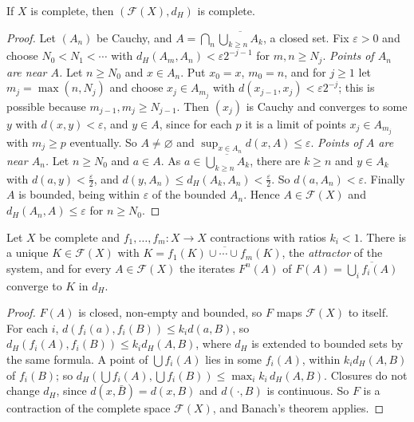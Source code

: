\begin{theorem}\label{thm:hausdorffcomplete}
If $X$ is complete, then $(\mathcal F(X),d_H)$ is complete.
\end{theorem}
\begin{proof}
Let $(A_n)$ be Cauchy, and $A=\bigcap_n\overline{\bigcup_{k\ge n}A_k}$, a closed set. Fix $\varepsilon>0$ and choose $N_0<N_1<\cdots$ with $d_H(A_m,A_n)<\varepsilon2^{-j-1}$ for
$m,n\ge N_j$. \emph{Points of $A_n$ are near $A$.} Let $n\ge N_0$ and $x\in A_n$. Put $x_0=x$, $m_0=n$, and for $j\ge1$ let $m_j=\max(n,N_j)$ and choose $x_j\in A_{m_j}$ with
$d(x_{j-1},x_j)<\varepsilon2^{-j}$; this is possible because $m_{j-1},m_j\ge N_{j-1}$. Then $(x_j)$ is Cauchy and converges to some $y$ with $d(x,y)<\varepsilon$, and $y\in A$,
since for each $p$ it is a limit of points $x_j\in A_{m_j}$ with $m_j\ge p$ eventually. So $A\ne\varnothing$ and $\sup_{x\in A_n}d(x,A)\le\varepsilon$.
\emph{Points of $A$ are near $A_n$.} Let $n\ge N_0$ and $a\in A$. As $a\in\overline{\bigcup_{k\ge n}A_k}$, there are $k\ge n$ and $y\in A_k$ with $d(a,y)<\frac\varepsilon2$, and
$d(y,A_n)\le d_H(A_k,A_n)<\frac\varepsilon2$. So $d(a,A_n)<\varepsilon$. Finally $A$ is bounded, being within $\varepsilon$ of the bounded $A_n$. Hence $A\in\mathcal F(X)$ and
$d_H(A_n,A)\le\varepsilon$ for $n\ge N_0$.
\end{proof}

\begin{theorem}[Hutchinson, 1981]\label{thm:hutchinson}
Let $X$ be complete and $f_1,\dots,f_m:X\to X$ contractions with ratios $k_i<1$. There is a unique $K\in\mathcal F(X)$ with
$K=\overline{f_1(K)\cup\cdots\cup f_m(K)}$, the \emph{attractor} of the system, and for every $A\in\mathcal F(X)$ the iterates $F^n(A)$ of
$F(A)=\overline{\bigcup_if_i(A)}$ converge to $K$ in $d_H$.
\end{theorem}
\begin{proof}
$F(A)$ is closed, non-empty and bounded, so $F$ maps $\mathcal F(X)$ to itself. For each $i$, $d(f_i(a),f_i(B))\le k_id(a,B)$, so $d_H(f_i(A),f_i(B))\le k_id_H(A,B)$,
where $d_H$ is extended to bounded sets by the same formula. A point of $\bigcup f_i(A)$ lies in some $f_i(A)$, within $k_id_H(A,B)$ of $f_i(B)$; so
$d_H(\bigcup f_i(A),\bigcup f_i(B))\le\max_ik_i\,d_H(A,B)$. Closures do not change $d_H$, since $d(x,\bar B)=d(x,B)$ and $d(\cdot,B)$ is continuous. So $F$ is a
contraction of the complete space $\mathcal F(X)$, and Banach's theorem applies.
\end{proof}

